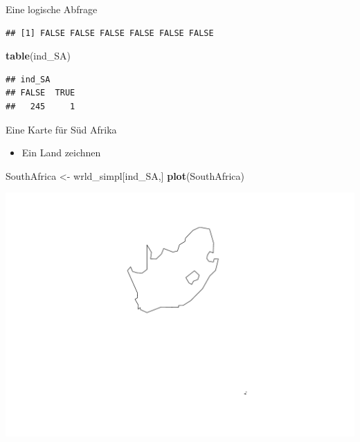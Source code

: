 \documentclass[ignorenonframetext,]{beamer}
\newenvironment{Shaded}{\begin{snugshade}}{\end{snugshade}}
\newcommand{\KeywordTok}[1]{\textcolor[rgb]{0.26,0.66,0.93}{\textbf{#1}}}
\newcommand{\NormalTok}[1]{\textcolor[rgb]{0.74,0.68,0.62}{#1}}
\newcommand{\OperatorTok}[1]{\textcolor[rgb]{0.74,0.68,0.62}{#1}}
\newcommand{\StringTok}[1]{\textcolor[rgb]{0.02,0.61,0.04}{#1}}
\providecommand{\tightlist}{%
  \setlength{\itemsep}{0pt}\setlength{\parskip}{0pt}}
\begin{document}
\begin{frame}[fragile]{Eine logische Abfrage}
\protect\hypertarget{eine-logische-abfrage}{}

\begin{Shaded}
\end{Shaded}

\begin{verbatim}
## [1] FALSE FALSE FALSE FALSE FALSE FALSE
\end{verbatim}

\begin{Shaded}
\begin{Highlighting}[]
\KeywordTok{table}\NormalTok{(ind_SA)}
\end{Highlighting}
\end{Shaded}

\begin{verbatim}
## ind_SA
## FALSE  TRUE 
##   245     1
\end{verbatim}

\end{frame}

\begin{frame}[fragile]{Eine Karte für Süd Afrika}
\protect\hypertarget{eine-karte-fur-sud-afrika}{}

\begin{itemize}
\tightlist
\item
  Ein Land zeichnen
\end{itemize}

\begin{Shaded}
\begin{Highlighting}[]
\NormalTok{SouthAfrica <-}\StringTok{ }\NormalTok{wrld_simpl[ind_SA,]}
\KeywordTok{plot}\NormalTok{(SouthAfrica)}
\end{Highlighting}
\end{Shaded}

\includegraphics{Geomedizin_files/figure-beamer/unnamed-chunk-71-1.pdf}

\end{frame}
\end{document}

